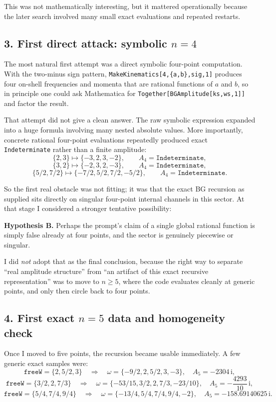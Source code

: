 \documentclass[11pt]{article}
\newcommand{\ii}{\mathrm{i}}
\begin{document}
This was not mathematically interesting, but it mattered operationally because
the later search involved many small exact evaluations and repeated restarts.

\subsection*{3. First direct attack: symbolic $n=4$}

The most natural first attempt was a direct symbolic four-point computation.
With the two-minus sign pattern, \texttt{MakeKinematics[4,\{a,b\},sig,1]}
produces four on-shell frequencies and momenta that are rational functions of
$a$ and $b$, so in principle one could ask Mathematica for
\texttt{Together[BGAmplitude[ks,ws,1]]} and factor the result.

That attempt did not give a clean answer. The raw symbolic expression expanded
into a huge formula involving many nested absolute values. More importantly,
concrete rational four-point evaluations repeatedly produced exact
\texttt{Indeterminate} rather than a finite amplitude:
\[
\{2,3\} \mapsto \{-3,2,3,-2\}, \qquad A_4 = \texttt{Indeterminate},
\]
\[
\{3,2\} \mapsto \{-2,3,2,-3\}, \qquad A_4 = \texttt{Indeterminate},
\]
\[
\{5/2,7/2\} \mapsto \{-7/2,5/2,7/2,-5/2\}, \qquad A_4 = \texttt{Indeterminate}.
\]

So the first real obstacle was not fitting; it was that the exact BG recursion
as supplied sits directly on singular four-point internal channels in this
sector. At that stage I considered a stronger tentative possibility:

\medskip
\textbf{Hypothesis B.} Perhaps the prompt's claim of a single global rational
function is simply false already at four points, and the sector is genuinely
piecewise or singular.
\medskip

I did \emph{not} adopt that as the final conclusion, because the right way to
separate ``real amplitude structure'' from ``an artifact of this exact
recursive representation'' was to move to $n \ge 5$, where the code evaluates
cleanly at generic points, and only then circle back to four points.

\subsection*{4. First exact $n=5$ data and homogeneity check}

Once I moved to five points, the recursion became usable immediately. A few
generic exact samples were:
\[
\texttt{freeW}=\{2,5/2,3\}
\quad\Longrightarrow\quad
\omega = \{-9/2,2,5/2,3,-3\},
\quad
A_5=-2304\,\ii,
\]
\[
\texttt{freeW}=\{3/2,2,7/3\}
\quad\Longrightarrow\quad
\omega = \{-53/15,3/2,2,7/3,-23/10\},
\quad
A_5=-\frac{4293}{10}\,\ii,
\]
\[
\texttt{freeW}=\{5/4,7/4,9/4\}
\quad\Longrightarrow\quad
\omega = \{-13/4,5/4,7/4,9/4,-2\},
\quad
A_5=-158.69140625\,\ii.
\]
\end{document}

